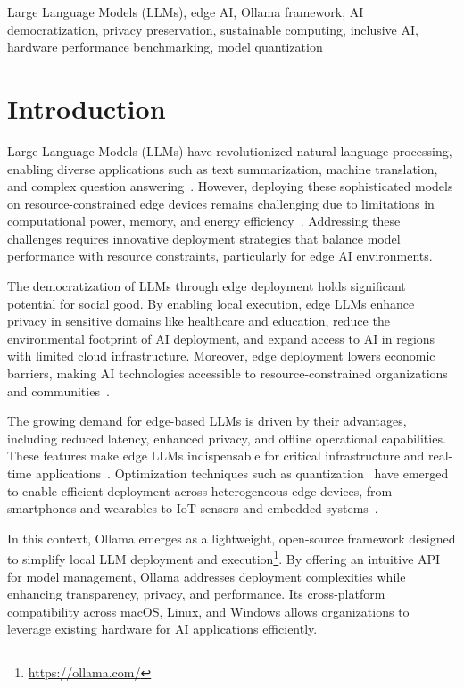 \documentclass[conference]{IEEEtran}
\begin{document}
\begin{IEEEkeywords}
Large Language Models (LLMs), edge AI, Ollama framework, AI democratization, privacy preservation, sustainable computing, inclusive AI, hardware performance benchmarking, model quantization
\end{IEEEkeywords}

\section{Introduction}

Large Language Models (LLMs) have revolutionized natural language processing, enabling diverse applications such as text summarization, machine translation, and complex question answering~\cite{zheng2024review}. However, deploying these sophisticated models on resource-constrained edge devices remains challenging due to limitations in computational power, memory, and energy efficiency~\cite{dhar2024empirical, zheng2024review}. Addressing these challenges requires innovative deployment strategies that balance model performance with resource constraints, particularly for edge AI environments.

The democratization of LLMs through edge deployment holds significant potential for social good. By enabling local execution, edge LLMs enhance privacy in sensitive domains like healthcare and education, reduce the environmental footprint of AI deployment, and expand access to AI in regions with limited cloud infrastructure. Moreover, edge deployment lowers economic barriers, making AI technologies accessible to resource-constrained organizations and communities~\cite{singh2024survey}.

The growing demand for edge-based LLMs is driven by their advantages, including reduced latency, enhanced privacy, and offline operational capabilities. These features make edge LLMs indispensable for critical infrastructure and real-time applications~\cite{zheng2024review}. Optimization techniques such as quantization~\cite{kim2024shortened, frantar2022optimal} have emerged to enable efficient deployment across heterogeneous edge devices, from smartphones and wearables to IoT sensors and embedded systems~\cite{zheng2024review}.

In this context, Ollama emerges as a lightweight, open-source framework designed to simplify local LLM deployment and execution\footnote{\url{https://ollama.com/}}. By offering an intuitive API for model management, Ollama addresses deployment complexities while enhancing transparency, privacy, and performance. Its cross-platform compatibility across macOS, Linux, and Windows allows organizations to leverage existing hardware for AI applications efficiently.
\end{document}
